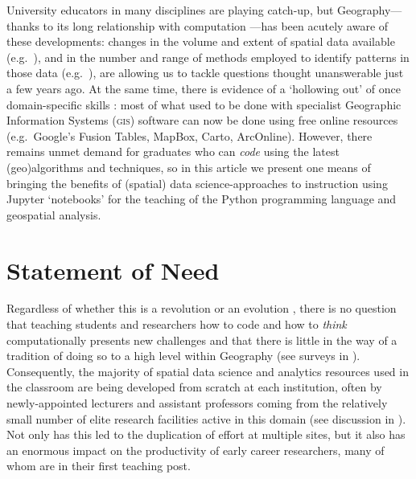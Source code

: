 \documentclass[letter, 11pt,titlepage]{article}
\newcommand{\eg}{e.g.~\/}
\begin{document}
University educators in many disciplines are playing catch-up, but Geography---thanks to its long relationship with computation \citep{ArribasBel2018}---has been acutely aware of these developments: changes in the volume and extent of spatial data available (\eg \citealp{Graham2013,gonzalez2013big,reades2016}), and in the number and range of methods employed to identify patterns in those data (\eg \citealp{Fan2016,Naik2017,Santibanez2015,Stevens2015,ArribasBel2017}), are allowing us to tackle questions thought unanswerable just a few years ago. At the same time, there is evidence of a `hollowing out' of once domain-specific skills \citep{Singleton2014,Singleton2016}: most of what used to be done with specialist Geographic Information Systems (\textsc{gis}) software can now be done using free online resources (\eg Google's Fusion Tables, MapBox, Carto, ArcOnline). However, there remains unmet demand for graduates who can \emph{code} using the latest (geo)algorithms and techniques, so in this article we present one means of bringing the benefits of (spatial) data science-approaches to instruction using Jupyter `notebooks' for the teaching of the Python programming language and geospatial analysis.

\section{Statement of Need}

Regardless of whether this is a revolution \citep{Wyly2014,Torrens2010} or an
evolution \citep{Barnes2013,Barnes2014}, there is no question that teaching
students and researchers how to code and how to \emph{think} computationally \citep{Barba_2015_bids} presents new challenges \citep{Etherington2016,Muller2014,rey_09jgs} and that there is little in the way of a tradition of doing so to a high level within Geography (see surveys in \citealp{Bowlick2017,Bowlick2018}). Consequently, the majority of spatial data science and analytics resources used in the classroom are being developed from scratch at each institution, often by newly-appointed lecturers and assistant professors coming from the relatively small number of elite research facilities active in this domain (see discussion in \citealp{esrc2013}). Not only has this led to the duplication of effort at multiple sites, but it also has an enormous impact on the productivity of early career researchers, many of whom are in their first teaching post.
\end{document}
